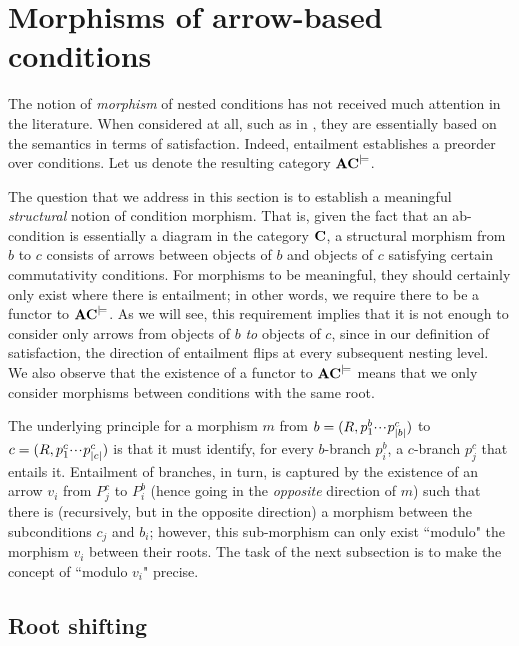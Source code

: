 \section{Morphisms of arrow-based conditions}

The notion of \emph{morphism} of nested conditions has not received much attention in the literature. When considered at all, such as in \cite{bchk:conditional-reactive-systems,sksclo:coinductive-techniques-for-satisfiability}, they are essentially based on the semantics in terms of satisfaction. Indeed, entailment establishes a preorder over conditions. Let us denote the resulting category $\mathbf{AC}^{\models}$.

The question that we address in this section is to establish a meaningful \emph{structural} notion of condition morphism. That is, given the fact that an ab-condition is essentially a diagram in the category $\mathbf{C}$, a structural morphism from $b$ to $c$ consists of arrows between objects of $b$ and objects of $c$ satisfying certain commutativity conditions. For morphisms to be meaningful, they should certainly only exist where there is entailment; in other words, we require there to be a functor to $\mathbf{AC}^{\models}$. As we will see, this requirement implies that it is not enough to consider only arrows from objects of $b$ \emph{to} objects of $c$, since in our definition of satisfaction, the direction of entailment flips at every subsequent nesting level. We also observe that the existence of a functor to $\mathbf{AC}^{\models}$ means that we only consider morphisms between conditions with the same root.

The underlying principle for a morphism $m$ from $b=(R,p^b_1{\cdotp\mkern-2mu\cdotp\mkern-2mu\cdotp\mkern1mu} p^c_{|b|})$ to $c=(R,p^c_1{\cdotp\mkern-2mu\cdotp\mkern-2mu\cdotp\mkern1mu} p^c_{|c|})$ is that it must identify, for every $b$-branch $p^b_i$, a $c$-branch $p^c_j$ that entails it. Entailment of branches, in turn, is captured by the existence of an arrow $v_i$ from $P^c_j$ to $P^b_i$ (hence going in the \emph{opposite} direction of $m$) such that there is (recursively, but in the opposite direction) a morphism between the subconditions $c_j$ and $b_i$; however, this sub-morphism can only exist ``modulo" the morphism $v_i$ between their roots. The task of the next subsection is to make the concept of ``modulo $v_i$" precise.

\subsection{Root shifting}

